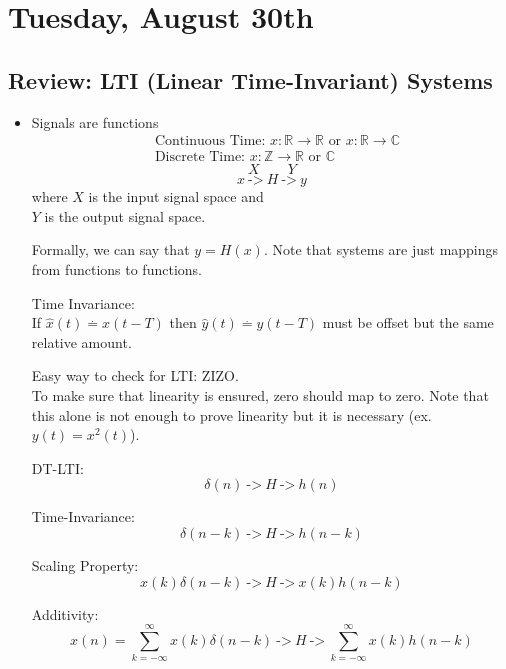 \section{Tuesday, August 30th}
\subsection{Review: LTI (Linear Time-Invariant) Systems}

\begin{itemize}
    \item Signals are functions
    \begin{align*}
    &\text{Continuous Time: } x : \mathbb{R} \rightarrow \mathbb{R} 
    \text{ or } x : \mathbb{R} \rightarrow\mathbb{C}
    \\
    &\text{Discrete Time: } x :  \mathbb{Z} \rightarrow \mathbb{R} \text{ or } \mathbb{C}
    \end{align*}
    \[
        X \quad\quad Y
    \]
    \[
        x \ \texttt{->} \ \boxed{H} \ \texttt{->} \  y
    \]
    where $X$ is the input signal space and\\
    $Y$ is the output signal space.
    
    Formally, we can say that $y=H(x)$. Note that systems are just mappings from functions to functions.
    
    \begin{shaded}
    Time Invariance:\\
    If $\hat x(t)\stackrel{.} = x(t-T)$ then $\hat y(t) \stackrel.= y(t-T)$ must be offset but the same relative amount.
    \end{shaded}
    
    Easy way to check for LTI: ZIZO.\\
    To make sure that linearity is ensured, zero should map to zero. Note that this alone is not enough to prove linearity but it is necessary (ex. $y(t)=x^2(t)$).

    DT-LTI:    
    \[
        \delta(n) \ \texttt{->} \ \boxed{H} \ \texttt{->} \  h(n)
    \]
    
    Time-Invariance:
    \[
        \delta(n-k) \ \texttt{->} \ \boxed{H} \ \texttt{->} \  h(n-k)
    \]
    
    Scaling Property:
    \[
        x(k)\delta(n-k) \ \texttt{->} \ \boxed{H} \ \texttt{->} \  x(k)h(n-k)
    \]
    
    Additivity:
    \[
        x(n)=\sum_{k=-\infty}^\infty x(k)\delta(n-k) \ \texttt{->} \ \boxed{H} \ \texttt{->} \  \sum_{k=-\infty}^\infty x(k)h(n-k)
    \]
    

\end{itemize}
